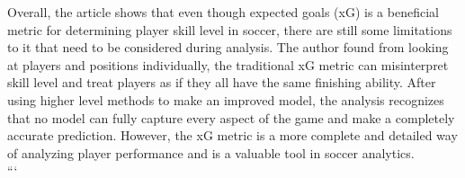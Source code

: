 \documentclass[
  11pt,
  letterpaper,
  DIV=11,
  numbers=noendperiod]{scrartcl}
\begin{document}
Overall, the article shows that even though expected goals (xG) is a
beneficial metric for determining player skill level in soccer, there
are still some limitations to it that need to be considered during
analysis. The author found from looking at players and positions
individually, the traditional xG metric can misinterpret skill level and
treat players as if they all have the same finishing ability. After
using higher level methods to make an improved model, the analysis
recognizes that no model can fully capture every aspect of the game and
make a completely accurate prediction. However, the xG metric is a more
complete and detailed way of analyzing player performance and is a
valuable tool in soccer analytics.\\
```
\end{document}
